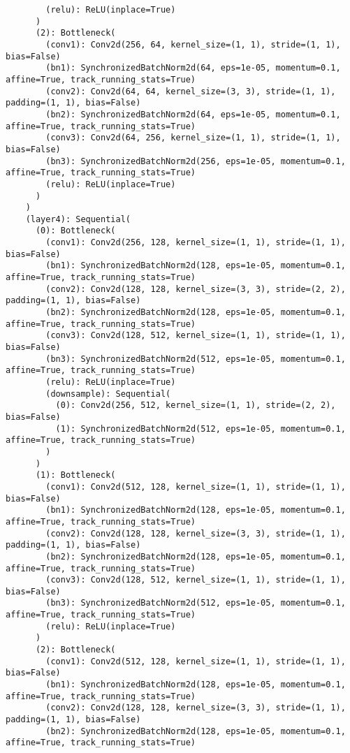 \begin{verbatim}
        (relu): ReLU(inplace=True)
      )
      (2): Bottleneck(
        (conv1): Conv2d(256, 64, kernel_size=(1, 1), stride=(1, 1), bias=False)
        (bn1): SynchronizedBatchNorm2d(64, eps=1e-05, momentum=0.1, affine=True, track_running_stats=True)
        (conv2): Conv2d(64, 64, kernel_size=(3, 3), stride=(1, 1), padding=(1, 1), bias=False)
        (bn2): SynchronizedBatchNorm2d(64, eps=1e-05, momentum=0.1, affine=True, track_running_stats=True)
        (conv3): Conv2d(64, 256, kernel_size=(1, 1), stride=(1, 1), bias=False)
        (bn3): SynchronizedBatchNorm2d(256, eps=1e-05, momentum=0.1, affine=True, track_running_stats=True)
        (relu): ReLU(inplace=True)
      )
    )
    (layer4): Sequential(
      (0): Bottleneck(
        (conv1): Conv2d(256, 128, kernel_size=(1, 1), stride=(1, 1), bias=False)
        (bn1): SynchronizedBatchNorm2d(128, eps=1e-05, momentum=0.1, affine=True, track_running_stats=True)
        (conv2): Conv2d(128, 128, kernel_size=(3, 3), stride=(2, 2), padding=(1, 1), bias=False)
        (bn2): SynchronizedBatchNorm2d(128, eps=1e-05, momentum=0.1, affine=True, track_running_stats=True)
        (conv3): Conv2d(128, 512, kernel_size=(1, 1), stride=(1, 1), bias=False)
        (bn3): SynchronizedBatchNorm2d(512, eps=1e-05, momentum=0.1, affine=True, track_running_stats=True)
        (relu): ReLU(inplace=True)
        (downsample): Sequential(
          (0): Conv2d(256, 512, kernel_size=(1, 1), stride=(2, 2), bias=False)
          (1): SynchronizedBatchNorm2d(512, eps=1e-05, momentum=0.1, affine=True, track_running_stats=True)
        )
      )
      (1): Bottleneck(
        (conv1): Conv2d(512, 128, kernel_size=(1, 1), stride=(1, 1), bias=False)
        (bn1): SynchronizedBatchNorm2d(128, eps=1e-05, momentum=0.1, affine=True, track_running_stats=True)
        (conv2): Conv2d(128, 128, kernel_size=(3, 3), stride=(1, 1), padding=(1, 1), bias=False)
        (bn2): SynchronizedBatchNorm2d(128, eps=1e-05, momentum=0.1, affine=True, track_running_stats=True)
        (conv3): Conv2d(128, 512, kernel_size=(1, 1), stride=(1, 1), bias=False)
        (bn3): SynchronizedBatchNorm2d(512, eps=1e-05, momentum=0.1, affine=True, track_running_stats=True)
        (relu): ReLU(inplace=True)
      )
      (2): Bottleneck(
        (conv1): Conv2d(512, 128, kernel_size=(1, 1), stride=(1, 1), bias=False)
        (bn1): SynchronizedBatchNorm2d(128, eps=1e-05, momentum=0.1, affine=True, track_running_stats=True)
        (conv2): Conv2d(128, 128, kernel_size=(3, 3), stride=(1, 1), padding=(1, 1), bias=False)
        (bn2): SynchronizedBatchNorm2d(128, eps=1e-05, momentum=0.1, affine=True, track_running_stats=True)

\end{verbatim}
